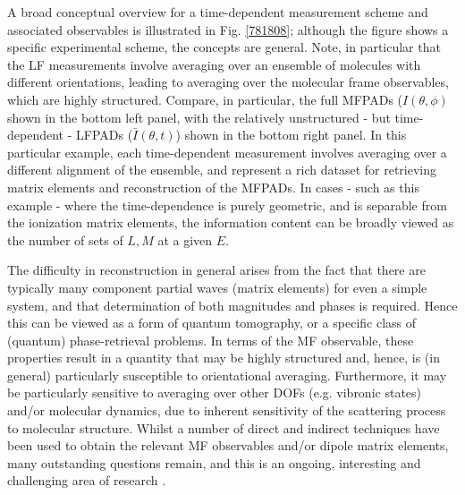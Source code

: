 A broad conceptual overview for a time-dependent measurement scheme and associated observables is illustrated in Fig. \ref{781808}; although the figure shows a specific experimental scheme, the concepts are general. Note, in particular that the LF measurements involve averaging over an ensemble of molecules with different orientations, leading to averaging over the molecular frame observables, which are highly structured. Compare, in particular, the full MFPADs ($I(\theta,\phi)$ shown in the bottom left panel, with the relatively unstructured - but time-dependent - LFPADs ($\bar{I}(\theta,t)$) shown in the bottom right panel. In this particular example, each time-dependent measurement involves averaging over a different alignment of the ensemble, and represent a rich dataset for retrieving matrix elements and reconstruction of the MFPADs. In cases - such as this example - where the time-dependence is purely geometric, and is separable from the ionization matrix elements, the information content can be broadly viewed as the number of sets of ${L,M}$ at a given $E$.

The difficulty in reconstruction in general arises from the fact that there are typically many component partial waves (matrix elements) for even a simple system, and that determination of both magnitudes and phases is required. Hence this can be viewed as a form of quantum tomography, or a specific class of (quantum) phase-retrieval problems. In terms of the MF observable, these properties result in a quantity that may be highly structured and, hence, is (in general) particularly susceptible to orientational averaging. Furthermore, it may be particularly sensitive to averaging over other DOFs (e.g. vibronic states) and/or molecular dynamics, due to inherent sensitivity of the scattering process to molecular structure. Whilst a number of direct and indirect techniques have been used to obtain the relevant MF observables and/or dipole matrix elements, many outstanding questions remain, and this is an ongoing, interesting and challenging area of research \cite{hockett2018QuantumMetrologyPhotoelectrons,hockett2018QuantumMetrologyPhotoelectronsa}.
